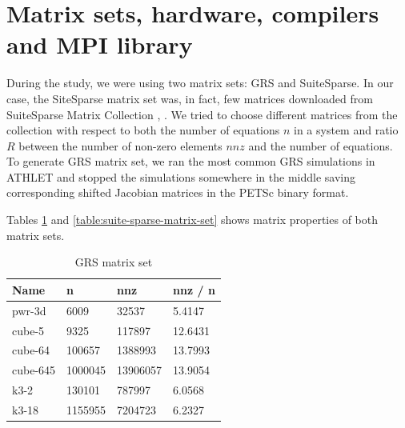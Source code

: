 \section{Matrix sets, hardware, compilers and MPI library} \label{subseq:matrix-sets-and-hardware}


During the study, we were using two matrix sets: GRS and SuiteSparse. In our case, the SiteSparse matrix set was, in fact, few matrices downloaded from SuiteSparse Matrix Collection \cite{sparse-matrix-collection:1}, \cite{sparse-matrix-collection:2}. We tried to choose different matrices from the collection with respect to both the number of equations $n$ in a system and ratio $R$ between the number of non-zero elements $nnz$ and the number of equations.\\ 


To generate GRS matrix set, we ran the most common GRS simulations in ATHLET and stopped the simulations somewhere in the middle saving corresponding shifted Jacobian matrices in the PETSc binary format.\\

Tables \ref{table:grs-matrix-set}  and \ref{table:suite-sparse-matrix-set} shows matrix properties of both matrix sets.\\

\begin{table}[ht]
\centering
\begin{tabular}{|l|l|l|l|}
\hline
Name     & n       & nnz      & nnz / n \\ \hline
pwr-3d   & 6009    & 32537   & 5.4147 \\ \hline
cube-5   & 9325    & 117897   & 12.6431  \\ \hline
cube-64  & 100657  & 1388993  & 13.7993 \\ \hline
cube-645 & 1000045 & 13906057 & 13.9054 \\ \hline
k3-2     & 130101  & 787997   & 6.0568  \\ \hline
k3-18    & 1155955 & 7204723  & 6.2327  \\ \hline
\end{tabular}
\caption{GRS matrix set}
\label{table:grs-matrix-set}
\end{table}



